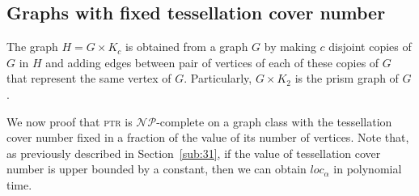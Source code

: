 \documentclass[9pt]{entcs} \usepackage{entcsmacro}
\begin{document}

\subsection{Graphs with fixed tessellation cover number}
\label{sub:33}

The graph $H=G \times K_c$ is obtained from a graph $G$ by making $c$ disjoint copies of $G$ in $H$ and adding edges between pair of vertices of each of these copies of $G$ that represent the same vertex of $G$. Particularly, $G \times K_2$ is the prism graph of $G$.

We now proof that \textsc{ptr} is $\mathcal{NP}$-complete on a graph class with the tessellation cover number fixed in a fraction of the value of its number of vertices.
Note that, as previously described in Section~\ref{sub:31}, if the value of tessellation cover number is upper bounded by a constant, then we can obtain $loc_\alpha$ in polynomial time.
\end{document}
